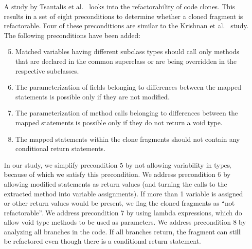 A study by Tsantalis et al.~\cite{tsantalis2015assessing} looks into the refactorability of code clones. This results in a set of eight preconditions to determine whether a cloned fragment is refactorable. Four of these preconditions are similar to the Krishnan et al.~\cite{krishnan2014unification} study. The following preconditions have been added:
\begin{enumerate}
  \setcounter{enumi}{4}
  \item Matched variables having different subclass types should call only methods that are declared in the common superclass or are being overridden in the respective subclasses.
  \item The parameterization of fields belonging to differences between the mapped statements is possible only if they are not modified.
  \item The parameterization of method calls belonging to differences between the mapped statements is possible only if they do not return a void type.
  \item The mapped statements within the clone fragments should not contain any conditional return statements.
\end{enumerate}
In our study, we simplify precondition 5 by not allowing variability in types, because of which we satisfy this precondition. We address precondition 6 by allowing modified statements as return values (and turning the calls to the extracted method into variable assignments). If more than 1 variable is assigned or other return values would be present, we flag the cloned fragments as ``not refactorable''. We address precondition 7 by using lambda expressions, which do allow void type methods to be used as parameters. We address precondition 8 by analyzing all branches in the code. If all branches return, the fragment can still be refactored even though there is a conditional return statement.

